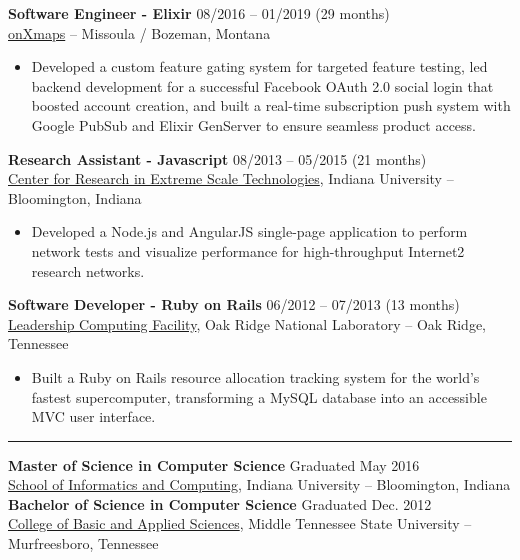 \documentclass[12pt,letterpaper]{article}
\begin{document}
\noindent\textbf{Software Engineer - Elixir}
\hfill{08/2016 -- 01/2019 (29 months)} \\
\href{https://www.onxmaps.com/}{onXmaps} -- Missoula / Bozeman, Montana

\begin{itemize}

  \item Developed a custom feature gating system for targeted feature testing, led backend development for a successful Facebook OAuth 2.0 social login that boosted account creation, and built a real-time subscription push system with Google PubSub and Elixir GenServer to ensure seamless product access.

\end{itemize}

\noindent\textbf{Research Assistant - Javascript}
\hfill{08/2013 -- 05/2015 (21 months)} \\
\href{https://pti.iu.edu/centers/crest.html}{Center for Research in Extreme Scale Technologies}, Indiana University -- Bloomington, Indiana

\begin{itemize}

  \item Developed a Node.js and AngularJS single-page application to perform network tests and visualize performance for high-throughput Internet2 research networks.

\end{itemize}

\noindent\textbf{Software Developer - Ruby on Rails}
\hfill{06/2012 -- 07/2013 (13 months)} \\
\href{https://www.olcf.ornl.gov/}{Leadership Computing Facility}, Oak Ridge National Laboratory -- Oak Ridge, Tennessee

\begin{itemize}

  \item Built a Ruby on Rails resource allocation tracking system for the world’s fastest supercomputer, transforming a MySQL database into an accessible MVC user interface.

\end{itemize}

\noindent\rule{7.5in}{0.4pt}

\noindent\textbf{Master of Science in Computer Science}
\hfill{Graduated May 2016} \\
\href{https://luddy.indiana.edu/}{School of Informatics and Computing}, Indiana University -- Bloomington, Indiana \\

\noindent\textbf{Bachelor of Science in Computer Science}
\hfill{Graduated Dec. 2012} \\
\href{https://www.mtsu.edu/cbas/}{College of Basic and Applied Sciences}, Middle Tennessee State University -- Murfreesboro, Tennessee
\end{document}
